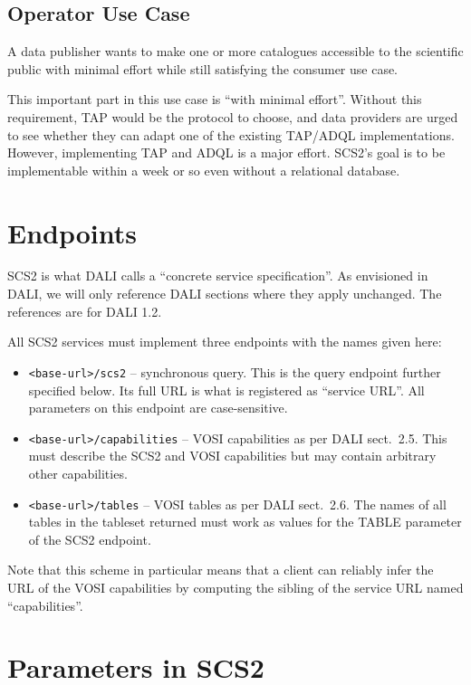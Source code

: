 \documentclass[11pt,a4paper]{ivoa}
\begin{document}
\subsection{Operator Use Case}

A data publisher wants to make one or more catalogues accessible to the
scientific public with minimal effort while still satisfying the
consumer use case.

This important part in this use case is ``with minimal effort''.
Without this requirement, TAP would be the protocol to choose, and data
providers are urged to see whether they can adapt one of the existing
TAP/ADQL implementations.  However, implementing TAP and ADQL is a major
effort.  SCS2's goal is to be implementable within a week or so even
without a relational database.

\section{Endpoints}

SCS2 is what DALI \citep{2017ivoa.spec.0517D} calls a ``concrete service
specification''.  As envisioned in DALI, we will only reference DALI
sections where they apply unchanged.  The references are for DALI 1.2.

All SCS2 services must implement three endpoints with the names given
here:

\begin{itemize}
\item \verb|<base-url>/scs2| -- synchronous query.  This is the query
endpoint further specified below.  Its full URL is what is registered as
``service URL''.  All parameters on this endpoint are case-sensitive.

\item \verb|<base-url>/capabilities| -- VOSI capabilities as per DALI
sect.~2.5.  This must describe the SCS2 and VOSI capabilities but may
contain arbitrary other capabilities.

\item \verb|<base-url>/tables| -- VOSI tables as per DALI sect.~2.6.
The names of all tables in the tableset returned must work as values for
the TABLE parameter of the SCS2 endpoint.
\end{itemize}

Note that this scheme in particular means that a client can reliably
infer the URL of the VOSI capabilities by computing the sibling of the
service URL named ``capabilities''.

\section{Parameters in SCS2}
\end{document}
